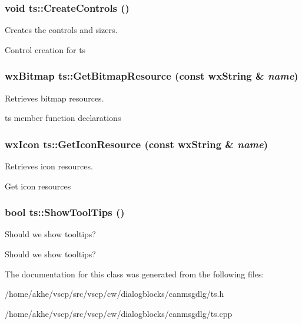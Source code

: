 \subsubsection{\setlength{\rightskip}{0pt plus 5cm}void ts::Create\-Controls ()}\label{classts_6342407304c75ac1471cb1a55ea10836}


Creates the controls and sizers. 

Control creation for ts 
\subsubsection{\setlength{\rightskip}{0pt plus 5cm}wx\-Bitmap ts::Get\-Bitmap\-Resource (const wx\-String \& {\em name})}\label{classts_619270ba29ca25eb561fc3166b421b39}


Retrieves bitmap resources. 

ts member function declarations 
\subsubsection{\setlength{\rightskip}{0pt plus 5cm}wx\-Icon ts::Get\-Icon\-Resource (const wx\-String \& {\em name})}\label{classts_3dfb3fd78ebd422d54634fd5f9847233}


Retrieves icon resources. 

Get icon resources 
\subsubsection{\setlength{\rightskip}{0pt plus 5cm}bool ts::Show\-Tool\-Tips ()\hspace{0.3cm}{\tt  [static]}}\label{classts_5c7f6e773d4ec18b0b63a46e22b4531c}


Should we show tooltips? 

Should we show tooltips? 

The documentation for this class was generated from the following files:\begin{CompactItemize}
\item 
/home/akhe/vscp/src/vscp/cw/dialogblocks/canmsgdlg/ts.h\item 
/home/akhe/vscp/src/vscp/cw/dialogblocks/canmsgdlg/ts.cpp\end{CompactItemize}
